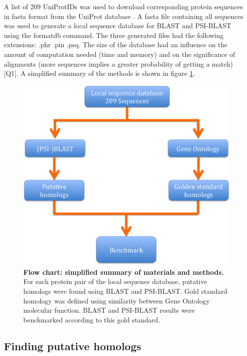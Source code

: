 \documentclass{article}
\begin{document}
A list of 209 UniProtIDs was used to download corresponding protein sequences in fasta format from the UniProt database \citep{consortium_uniprot:_2015}. A fasta file containing all sequences was used to generate a local sequence database for BLAST and PSI-BLAST using the formatdb command. The three generated files had the following extensions: .phr .pin .psq. The size of the database had an influence on the amount of computation needed (time and memory) and on the significance of alignments (more sequences implies a greater probability of getting a match) [Q1]. A simplified summary of the methods is shown in figure \ref{fig:flow_chart}.

\begin{figure}[!ht]
\includegraphics[width=\linewidth]{flow_chart}
\caption{\textbf{Flow chart: simplified summary of materials and methods.} For each protein pair of the local sequence database, putative homologs were found using BLAST and PSI-BLAST. Gold standard homology was defined using similarity between Gene Ontology molecular function. BLAST and PSI-BLAST results were benchmarked according to this gold standard.}
\label{fig:flow_chart}
\end{figure}

\subsection{Finding putative homologs}
\end{document}

